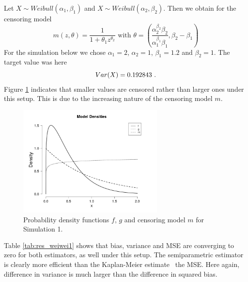 Let $X \sim Weibull(\alpha_1, \beta_1)$ and  $X \sim Weibull(\alpha_2, \beta_2)$.
Then we obtain for the censoring model 
$$m(z,\theta) = \frac{1}{1+\theta_1 z^{\theta_2}} \textrm{ with } \theta = \left(\frac{\alpha_2^{\beta_2}\beta_2}{\alpha_1^{\beta_1}\beta_1}, \beta_2 - \beta_1\right)$$
%
For the simulation below we chose $\alpha_1 = 2$, $\alpha_2 = 1$, $\beta_1 = 1.2$ and $\beta_2 = 1$. The target value was here
$$Var(X) = 0.192843\textrm{ .}$$
Figure \ref{fig:dens_wei_wei} indicates that smaller values are censored rather than larger ones under this setup.  This is due to the increasing nature of the censoring model $m$.
%
\clearpage
%
\begin{figure}[h!]
	\begin{center}
		\includegraphics[width=0.65\textwidth]{./figures/wei_wei_dens}
	\end{center}
	\caption{Probability density functions $f$, $g$ and censoring model $m$ for Simulation 1.}
	\label{fig:dens_wei_wei}
\end{figure}
\noindent Table \ref{tab:res_weiwei1} shows that bias, variance and MSE are converging to zero for both estimators, as well under this setup. The semiparametric estimator is clearly more efficient than the Kaplan-Meier estimate \wrt\ the MSE. Here again, difference in variance is much larger than the difference in squared bias. 
%
